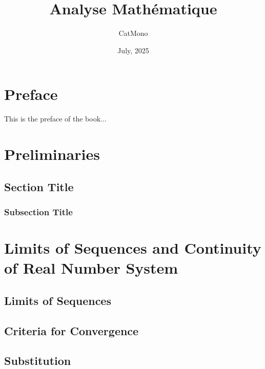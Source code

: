 \documentclass[11pt]{elegantbook}
\title{Analyse Mathématique} %
\author{CatMono} %
\date{July, 2025} %
\begin{document}
\maketitle %

\frontmatter        %
\tableofcontents    %

\chapter{Preface}   %
This is the preface of the book...

\mainmatter         %

\chapter{Preliminaries} %
\section{Section Title} %
\subsection{Subsection Title} %

\chapter{Limits of Sequences and Continuity of Real Number System} 
\section{Limits of Sequences}

\section{Criteria for Convergence}

\section{Substitution}
\end{document}
